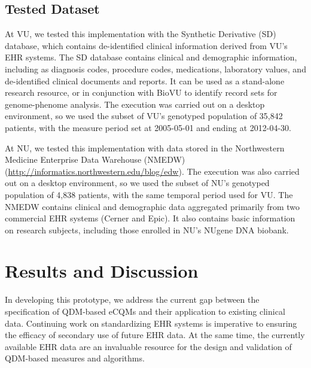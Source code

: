 \documentclass{article}
\begin{document}
\subsection{Tested Dataset}

At VU, we tested this implementation with the Synthetic Derivative (SD) database\cite{roden_development_2008}, which contains de-identified clinical information derived from VU's EHR systems. The SD database contains clinical and demographic information, including as diagnosis codes, procedure codes, medications, laboratory values, and de-identified clinical documents and reports. It can be used as a stand-alone research resource, or in conjunction with BioVU to identify record sets for genome-phenome analysis. The execution was carried out on a desktop environment, so we used the subset of VU's genotyped population of 35,842 patients, with the measure period set at 2005-05-01 and ending at 2012-04-30.

At NU, we tested this implementation with data stored in the Northwestern Medicine Enterprise Data Warehouse (NMEDW) (\url{http://informatics.northwestern.edu/blog/edw}). The execution was also carried out on a desktop environment, so we used the subset of NU's genotyped population of 4,838 patients, with the same temporal period used for VU.  The NMEDW contains clinical and demographic data aggregated primarily from two commercial EHR systems (Cerner and Epic). It also contains basic information on research subjects, including those enrolled in NU's NUgene DNA biobank.


\section{Results and Discussion}

In developing this prototype, we address the current gap between the specification of QDM-based eCQMs and their application to existing clinical data. Continuing work on standardizing EHR systems is imperative to ensuring the efficacy of secondary use of future EHR data. At the same time, the currently available EHR data are an invaluable resource for the design and validation of QDM-based measures and algorithms.
\end{document}
